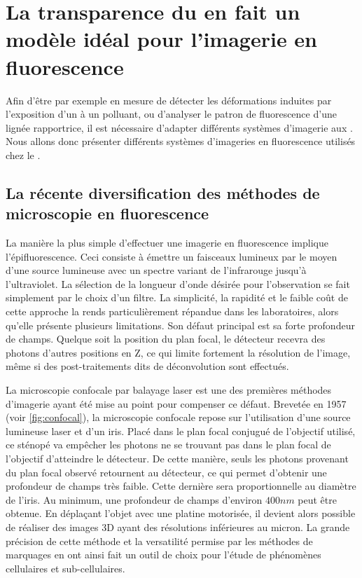 \documentclass[\main/main.tex]{subfiles}
\begin{document}
            
\section{La transparence du \pz{} en fait un modèle idéal pour l'imagerie en fluorescence}

\label{sec:imagerie}

Afin d'être par exemple en mesure de détecter les déformations induites par l'exposition d'un \pz{} à un polluant,
ou d'analyser le patron de fluorescence d'une lignée rapportrice,
il est nécessaire d'adapter différents systèmes d'imagerie aux \pz{}.
%
Nous allons donc présenter différents systèmes d'imageries en fluorescence utilisés chez le \pz{}.

    \subsection{La récente diversification des méthodes de microscopie en fluorescence}
    
La manière la plus simple d'effectuer une imagerie en fluorescence implique l'épifluorescence.
Ceci consiste à émettre un faisceaux lumineux par le moyen d'une source lumineuse avec un spectre variant de l'infrarouge jusqu'à l'ultraviolet.
%
La sélection de la longueur d'onde désirée pour l'observation se fait simplement par le choix d'un filtre.
%
La simplicité, la rapidité et le faible coût de cette approche la rends particulièrement répandue dans les laboratoires, alors qu'elle présente plusieurs limitations.
%
Son défaut principal est sa forte profondeur de champs.
%
Quelque soit la position du plan focal, le détecteur recevra des photons d'autres positions en Z, ce qui limite fortement la résolution de l'image, même si des post-traitements dits de déconvolution sont effectués.


%
La microscopie confocale par balayage laser est une des premières méthodes d'imagerie ayant été mise au point pour compenser ce défaut. 
%
Brevetée en 1957 (voir \autoref{fig:confocal}), la microscopie confocale repose sur l'utilisation d'une source lumineuse laser et d'un iris.
%
Placé dans le plan focal conjugué de l'objectif utilisé, ce sténopé va empêcher les photons ne se trouvant pas dans le plan focal de l'objectif d'atteindre le détecteur.
%
De cette manière, seuls les photons provenant du plan focal observé retournent au détecteur, ce qui permet d'obtenir une profondeur de champs très faible.
%
Cette dernière sera proportionnelle au diamètre de l'iris. Au minimum, une profondeur de champs d'environ $400 nm$ peut être obtenue.
%
En déplaçant l'objet avec une platine motorisée, il devient alors possible de réaliser des images 3D ayant des résolutions inférieures au micron.
%
La grande précision de cette méthode et la versatilité permise par les méthodes de marquages en ont ainsi fait un outil de choix pour l'étude de phénomènes cellulaires et sub-cellulaires.
\end{document}
